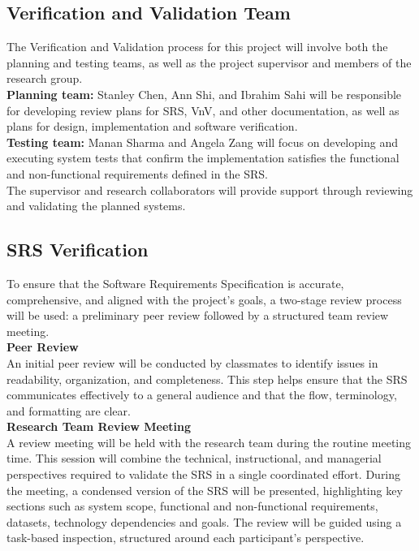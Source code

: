 \documentclass[12pt, titlepage]{article}
\begin{document}
\subsection{Verification and Validation Team}

The Verification and Validation process for this project will involve both the planning and testing teams, as well as the project supervisor and members of the research group.\\

\textbf{Planning team:} Stanley Chen, Ann Shi, and Ibrahim Sahi will be responsible for developing review plans for SRS, VnV, and other documentation, as well as plans for design, implementation and software verification.\\

\textbf{Testing team:} Manan Sharma and Angela Zang will focus on developing and executing system tests that confirm the implementation satisfies the functional and non-functional requirements defined in the SRS.\\

The supervisor and research collaborators will provide support through reviewing and validating the planned systems.

\subsection{SRS Verification}

To ensure that the Software Requirements Specification is accurate, comprehensive, and aligned with the project’s goals, a two-stage review process will be used: a preliminary peer review followed by a structured team review meeting.\\

\textbf{Peer Review}\\

An initial peer review will be conducted by classmates to identify issues in readability, organization, and completeness. This step helps ensure that the SRS communicates effectively to a general audience and that the flow, terminology, and formatting are clear.\\

\textbf{Research Team Review Meeting}\\

A review meeting will be held with the research team during the routine meeting time. This session will combine the technical, instructional, and managerial perspectives required to validate the SRS in a single coordinated effort. During the meeting, a condensed version of the SRS will be presented, highlighting key sections such as system scope, functional and non-functional requirements, datasets, technology dependencies and goals. The review will be guided using a task-based inspection, structured around each participant’s perspective.\\
\end{document}
